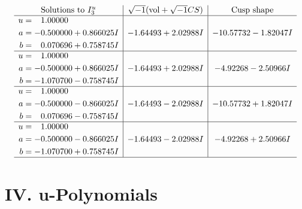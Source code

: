 \documentclass[1p]{elsarticle_modified}
\theoremstyle{definition}
\newcommand{\I}{\sqrt{-1}}
\begin{document}
$$\begin{array}{c|c|c}  
\text{Solutions to }I^u_{3}& \I (\text{vol} + \sqrt{-1}CS) & \text{Cusp shape}\\
 \hline 
\begin{aligned}
u &= \phantom{-}1.00000\phantom{ +0.000000I} \\
a &= -0.500000 + 0.866025 I \\
b &= \phantom{-}0.070696 + 0.758745 I\end{aligned}
 & -1.64493 + 2.02988 I & -10.57732 - 1.82047 I \\ \hline\begin{aligned}
u &= \phantom{-}1.00000\phantom{ +0.000000I} \\
a &= -0.500000 + 0.866025 I \\
b &= -1.070700 - 0.758745 I\end{aligned}
 & -1.64493 + 2.02988 I & -4.92268 - 2.50966 I \\ \hline\begin{aligned}
u &= \phantom{-}1.00000\phantom{ +0.000000I} \\
a &= -0.500000 - 0.866025 I \\
b &= \phantom{-}0.070696 - 0.758745 I\end{aligned}
 & -1.64493 - 2.02988 I & -10.57732 + 1.82047 I \\ \hline\begin{aligned}
u &= \phantom{-}1.00000\phantom{ +0.000000I} \\
a &= -0.500000 - 0.866025 I \\
b &= -1.070700 + 0.758745 I\end{aligned}
 & -1.64493 - 2.02988 I & -4.92268 + 2.50966 I\\
 \hline 
 \end{array}$$\newpage
\newpage\renewcommand{\arraystretch}{1}
\centering \section*{ IV. u-Polynomials}
\end{document}
